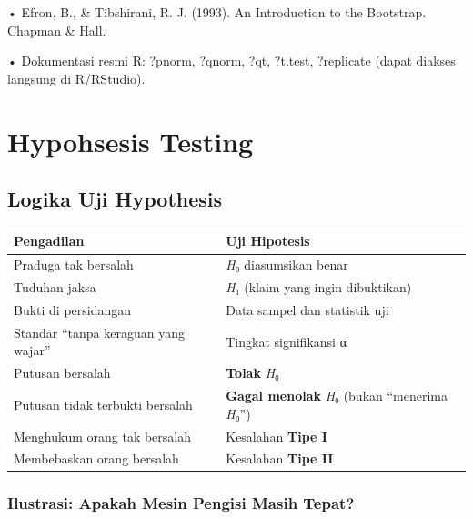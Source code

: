\documentclass[
  indonesian,
  letterpaper,
]{book}
\newcounter{none} %
\begin{document}
• Efron, B., \& Tibshirani, R. J. (1993). An Introduction to the
Bootstrap. Chapman \& Hall.

• Dokumentasi resmi R: ?pnorm, ?qnorm, ?qt, ?t.test, ?replicate (dapat
diakses langsung di R/RStudio).


\chapter{Hypohsesis Testing}\label{hypohsesis-testing}

\section{Logika Uji Hypothesis}\label{logika-uji-hypothesis}

{\def\LTcaptype{none} %
\begin{longtable}[]{@{}
  >{\raggedright\arraybackslash}p{}
  >{\raggedright\arraybackslash}p{}@{}}
\toprule\noalign{}
\begin{minipage}[b]{\linewidth}\raggedright
Pengadilan
\end{minipage} & \begin{minipage}[b]{\linewidth}\raggedright
Uji Hipotesis
\end{minipage} \\
\midrule\noalign{}
\endhead
\bottomrule\noalign{}
\endlastfoot
Praduga tak bersalah & \emph{H}₀ diasumsikan benar \\
Tuduhan jaksa & \emph{H}₁ (klaim yang ingin dibuktikan) \\
Bukti di persidangan & Data sampel dan statistik uji \\
Standar ``tanpa keraguan yang wajar'' & Tingkat signifikansi α \\
Putusan bersalah & \textbf{Tolak} \emph{H}₀ \\
Putusan tidak terbukti bersalah & \textbf{Gagal menolak} \emph{H}₀
(bukan ``menerima \emph{H}₀'') \\
Menghukum orang tak bersalah & Kesalahan \textbf{Tipe I} \\
Membebaskan orang bersalah & Kesalahan \textbf{Tipe II} \\
\end{longtable}
}

\subsection{Ilustrasi: Apakah Mesin Pengisi Masih
Tepat?}\label{ilustrasi-apakah-mesin-pengisi-masih-tepat}
\end{document}
